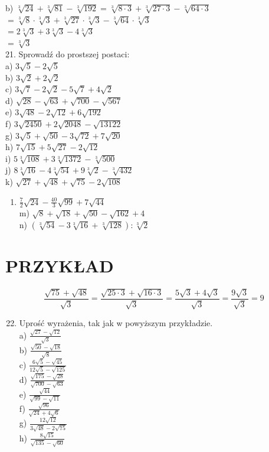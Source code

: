 \documentclass[10pt]{article}
\begin{document}
b) \(\sqrt[3]{24}+\sqrt[3]{81}-\sqrt[3]{192}=\sqrt[3]{8 \cdot 3}+\sqrt[3]{27 \cdot 3}-\sqrt[3]{64 \cdot 3}\)\\
\(=\sqrt[3]{8} \cdot \sqrt[3]{3}+\sqrt[3]{27} \cdot \sqrt[3]{3}-\sqrt[3]{64} \cdot \sqrt[3]{3}\)\\
\(=2 \sqrt[3]{3}+3 \sqrt[3]{3}-4 \sqrt[3]{3}\)\\
\(=\sqrt[3]{3}\)\\
21. Sprowadź do prostszej postaci:\\
a) \(3 \sqrt{5}-2 \sqrt{5}\)\\
b) \(3 \sqrt{2}+2 \sqrt{2}\)\\
c) \(3 \sqrt{7}-2 \sqrt{2}-5 \sqrt{7}+4 \sqrt{2}\)\\
d) \(\sqrt{28}-\sqrt{63}+\sqrt{700}-\sqrt{567}\)\\
e) \(3 \sqrt{48}-2 \sqrt{12}+6 \sqrt{192}\)\\
f) \(3 \sqrt{2450}+2 \sqrt{2048}-\sqrt{13122}\)\\
g) \(3 \sqrt{5}+\sqrt{50}-3 \sqrt{72}+7 \sqrt{20}\)\\
h) \(7 \sqrt{15}+5 \sqrt{27}-2 \sqrt{12}\)\\
i) \(5 \sqrt[3]{108}+3 \sqrt[3]{1372}-\sqrt[3]{500}\)\\
j) \(8 \sqrt[3]{16}-4 \sqrt[3]{54}+9 \sqrt[3]{2}-\sqrt[3]{432}\)\\
k) \(\sqrt{27}+\sqrt{48}+\sqrt{75}-2 \sqrt{108}\)

\begin{enumerate}
  \item \(\frac{7}{2} \sqrt{24}-\frac{40}{3} \sqrt{99}+7 \sqrt{44}\)\\
m) \(\sqrt{8}+\sqrt{18}+\sqrt{50}-\sqrt{162}+4\)\\
n) \((\sqrt[3]{54}-3 \sqrt[3]{16}+\sqrt[3]{128}): \sqrt[3]{2}\)
\end{enumerate}

\section*{PRZYKŁAD}
\[
\frac{\sqrt{75}+\sqrt{48}}{\sqrt{3}}=\frac{\sqrt{25 \cdot 3}+\sqrt{16 \cdot 3}}{\sqrt{3}}=\frac{5 \sqrt{3}+4 \sqrt{3}}{\sqrt{3}}=\frac{9 \sqrt{3}}{\sqrt{3}}=9
\]

\begin{enumerate}
  \setcounter{enumi}{21}
  \item Uprość wyrażenia, tak jak w powyższym przykładzie.\\
a) \(\frac{\sqrt{27}-\sqrt{12}}{\sqrt{3}}\)\\
b) \(\frac{\sqrt{50}-\sqrt{18}}{\sqrt{8}}\)\\
c) \(\frac{6 \sqrt{5}-\sqrt{45}}{12 \sqrt{5}-\sqrt{125}}\)\\
d) \(\frac{\sqrt{175}-\sqrt{28}}{\sqrt{700}-\sqrt{63}}\)\\
e) \(\frac{\sqrt{44}}{\sqrt{99}-\sqrt{11}}\)\\
f) \(\frac{\sqrt{96}}{\sqrt{24}+4 \sqrt{6}}\)\\
g) \(\frac{12 \sqrt{12}}{3 \sqrt{48}-2 \sqrt{75}}\)\\
h) \(\frac{8 \sqrt{15}}{\sqrt{135}-\sqrt{60}}\)
\end{enumerate}
\end{document}
